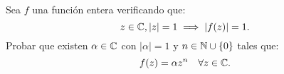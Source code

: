 \begin{ejercicio}
    Sea $f$ una función entera verificando que:
    \begin{equation*}
        z\in \mathbb{C}, |z|=1 \implies |f(z)|=1.
    \end{equation*}
    Probar que existen $\alpha\in \mathbb{C}$ con $|\alpha|=1$ y $n\in \mathbb{N}\cup\{0\}$ tales que:
    \begin{equation*}
        f(z)=\alpha z^n \quad \forall z\in \mathbb{C}.
    \end{equation*}
\end{ejercicio}